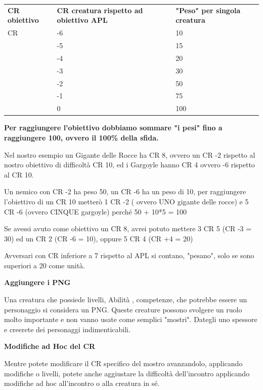\documentclass[a4paper,11pt,twoside,openany]{book}
\begin{document}
\begin{tabular}{lll}
	\toprule
	\textbf{CR obiettivo} & \textbf{CR creatura rispetto ad obiettivo APL} & \textbf{"Peso" per singola creatura}\tabularnewline
	CR                    & -6                                             & 10\tabularnewline
	                      & -5                                             & 15\tabularnewline
	                      & -4                                             & 20\tabularnewline
	                      & -3                                             & 30\tabularnewline
	                      & -2                                             & 50\tabularnewline
	                      & -1                                             & 75\tabularnewline
	                      & 0                                              & 100\tabularnewline
\end{tabular}

\bigskip

\textbf{Per raggiungere l'obiettivo dobbiamo sommare "i pesi"
	fino a raggiungere 100, ovvero il 100\% della sfida.}

Nel nostro esempio un Gigante delle Rocce ha CR 8, ovvero un CR -2 rispetto al nostro obiettivo di difficoltà CR 10, ed i Gargoyle hanno CR 4 ovvero -6 rispetto al CR 10.

Un nemico con CR -2 ha peso 50, un CR -6 ha un peso di 10, per raggiungere l'obiettivo di un CR 10 metterò 1 CR -2 ( ovvero UNO gigante delle rocce) e 5 CR -6 (ovvero CINQUE gargoyle) perché 50 + 10{*}5 = 100

Se avessi avuto come obiettivo un CR 8, avrei potuto mettere 3 CR 5 (CR -3 = 30) ed un CR 2 (CR -6 = 10), oppure 5 CR 4 (CR +4 = 20)

Avversari con CR inferiore a 7 rispetto al APL si contano, "pesano", solo se sono superiori a 20 come unità.

\textbf{Aggiungere i PNG}

Una creatura che possiede livelli, Abilità , competenze, che potrebbe essere un personaggio si considera un PNG. Queste creature possono svolgere un ruolo molto importante e non vanno usate come semplici "mostri". Dategli uno spessore e creerete dei personaggi indimenticabili.

\textbf{Modifiche ad Hoc del CR}

Mentre potete modificare il CR specifico del mostro avanzandolo, applicando modifiche o livelli, potete anche aggiustare la difficoltà dell'incontro applicando modifiche ad hoc all'incontro o alla creatura in sé.
\end{document}

